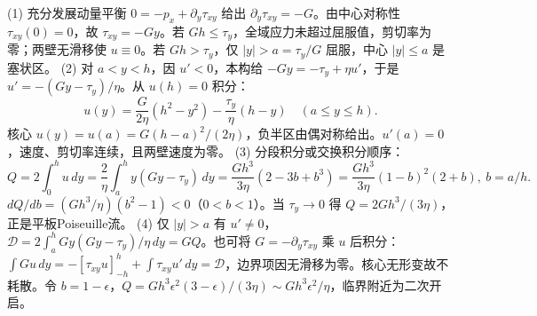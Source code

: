 (1) 充分发展动量平衡 \(0=-p_x+\partial_y\tau_{xy}\) 给出 \(\partial_y\tau_{xy}=-G\)。由中心对称性 \(\tau_{xy}(0)=0\)，故 \(\tau_{xy}=-Gy\)。若 \(Gh\leq\tau_y\)，全域应力未超过屈服值，剪切率为零；两壁无滑移使 \(u\equiv0\)。若 \(Gh>\tau_y\)，仅 \(|y|>a=\tau_y/G\) 屈服，中心 \(|y|\leq a\) 是塞状区。
(2) 对 \(a<y<h\)，因 \(u'<0\)，本构给 \(-Gy=-\tau_y+\eta u'\)，于是 \(u'=-(Gy-\tau_y)/\eta\)。从 \(u(h)=0\) 积分：
\[
u(y)=\frac{G}{2\eta}(h^2-y^2)-\frac{\tau_y}{\eta}(h-y)\quad(a\leq y\leq h).
\]
核心 \(u(y)=u(a)=G(h-a)^2/(2\eta)\)，负半区由偶对称给出。\(u'(a)=0\)，速度、剪切率连续，且两壁速度为零。
(3) 分段积分或交换积分顺序：
\[
Q=2\int_0^h u\,dy=\frac{2}{\eta}\int_a^h y(Gy-\tau_y)\,dy
=\frac{Gh^3}{3\eta}(2-3b+b^3)=\frac{Gh^3}{3\eta}(1-b)^2(2+b),\ b=a/h.
\]
\(dQ/db=(Gh^3/\eta)(b^2-1)<0\)（\(0<b<1\)）。当 \(\tau_y\to0\) 得 \(Q=2Gh^3/(3\eta)\)，正是平板Poiseuille流。
(4) 仅 \(|y|>a\) 有 \(u'\ne0\)，\(\mathcal D=2\int_a^h Gy(Gy-\tau_y)/\eta\,dy=GQ\)。也可将 \(G=-\partial_y\tau_{xy}\) 乘 \(u\) 后积分：\(\int Gu\,dy=-[\tau_{xy}u]_{-h}^h+\int\tau_{xy}u'\,dy=\mathcal D\)，边界项因无滑移为零。核心无形变故不耗散。令 \(b=1-\epsilon\)，\(Q=Gh^3\epsilon^2(3-\epsilon)/(3\eta)\sim Gh^3\epsilon^2/\eta\)，临界附近为二次开启。
